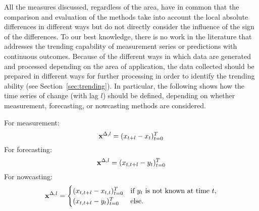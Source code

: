 All the measures discussed, regardless of the area, have in common that the comparison and evaluation of the methods take into account the local absolute differences in different ways but do not directly consider the influence of the sign of the differences. 
To our best knowledge, there is no work in the literature that addresses the trending capability of measurement series or predictions with continuous outcomes.
Because of the different ways in which data are generated and processed depending on the area of application, the data collected should be prepared in different ways for further processing in order to identify the trending ability (see Section~\ref{sec:trending}). 
In particular, the following shows how the time series of change (with lag $l$) should be defined, depending on whether measurement, forecasting, or nowcasting methods are considered.

For measurement:
\begin{equation}
    \mathbf{x}^{\Delta,l} = (x_{t+l} -x_{t})^T_{t=0} \label{eq:diffxl_measure}
\end{equation}
For forecasting:
\begin{equation}
    \mathbf{x}^{\Delta,l} = (x_{t,t+l} -y_{t})^T_{t=0} \label{eq:diffxl_forecasting}
\end{equation}
For nowcasting:
\begin{equation}
\mathbf{x}^{\Delta,l} = 
\begin{cases} 
(x_{t,t+l} -x_{t,t})^T_{t=0} & \text{if } y_{t} \text{ is not known at time } t, \\
(x_{t,t+l} -y_{t})^T_{t=0}  & \text{else}.
\end{cases} \label{eq:diffxl_nowcasting}
\end{equation}






